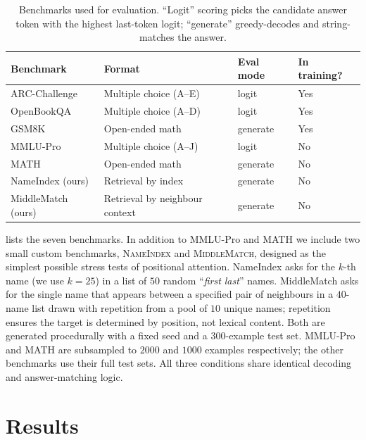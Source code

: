 \documentclass{article}
\begin{document}
\begin{table}[t]
  \caption{Benchmarks used for evaluation. ``Logit'' scoring picks the
  candidate answer token with the highest last-token logit; ``generate''
  greedy-decodes and string-matches the answer.}
  \label{tab:benchmarks}
  \centering
  \small
  \begin{tabular}{llll}
    \toprule
    Benchmark          & Format                         & Eval mode & In training? \\
    \midrule
    ARC-Challenge      & Multiple choice (A--E)         & logit     & Yes \\
    OpenBookQA         & Multiple choice (A--D)         & logit     & Yes \\
    GSM8K              & Open-ended math                & generate  & Yes \\
    MMLU-Pro           & Multiple choice (A--J)         & logit     & No \\
    MATH               & Open-ended math                & generate  & No \\
    NameIndex (ours)   & Retrieval by index             & generate  & No \\
    MiddleMatch (ours) & Retrieval by neighbour context & generate  & No \\
    \bottomrule
  \end{tabular}
\end{table}

 lists the seven benchmarks. In addition to
MMLU-Pro \citep{wang2024mmlupro} and MATH \citep{hendrycks2021math} we
include two small custom benchmarks, \textsc{NameIndex} and
\textsc{MiddleMatch}, designed as the simplest possible stress tests of
positional attention. NameIndex asks for the $k$-th name
(we use $k{=}25$) in a list of $50$ random ``\textit{first last}''
names. MiddleMatch asks for the single name that appears between a
specified pair of neighbours in a $40$-name list drawn with repetition
from a pool of $10$ unique names; repetition ensures the target is
determined by position, not lexical content. Both are generated
procedurally with a fixed seed and a $300$-example test set.
MMLU-Pro and MATH are subsampled to $2000$ and $1000$ examples
respectively; the other benchmarks use their full test sets. All three
conditions share identical decoding and answer-matching logic.


\section{Results}
\end{document}
